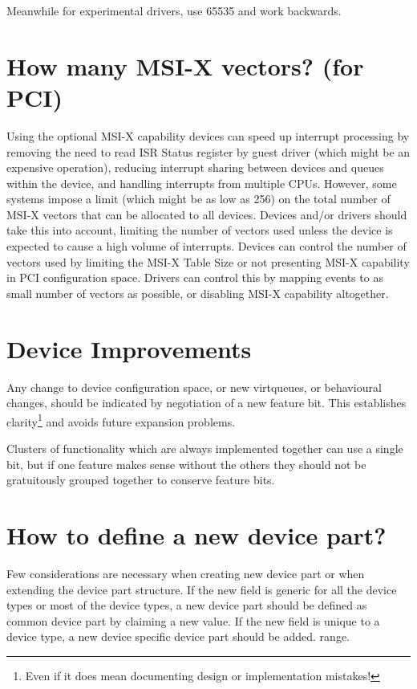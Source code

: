 Meanwhile for experimental drivers, use 65535 and work backwards.

\section{How many MSI-X vectors?  (for PCI)}\label{sec:Creating New Device Types / How many MSI-X vectors?  (for PCI)}

Using the optional MSI-X capability devices can speed up
interrupt processing by removing the need to read ISR Status
register by guest driver (which might be an expensive operation),
reducing interrupt sharing between devices and queues within the
device, and handling interrupts from multiple CPUs. However, some
systems impose a limit (which might be as low as 256) on the
total number of MSI-X vectors that can be allocated to all
devices. Devices and/or drivers should take this into
account, limiting the number of vectors used unless the device is
expected to cause a high volume of interrupts. Devices can
control the number of vectors used by limiting the MSI-X Table
Size or not presenting MSI-X capability in PCI configuration
space. Drivers can control this by mapping events to as small
number of vectors as possible, or disabling MSI-X capability
altogether.

\section{Device Improvements}\label{sec:Creating New Device Types / Device Improvements}

Any change to device configuration space, or new virtqueues, or
behavioural changes, should be indicated by negotiation of a new
feature bit. This establishes clarity\footnote{Even if it does mean documenting design or implementation
mistakes!
} and avoids future expansion problems.

Clusters of functionality which are always implemented together
can use a single bit, but if one feature makes sense without the
others they should not be gratuitously grouped together to
conserve feature bits.

\section{How to define a new device part?}\label{sec:Creating New Device Types or Extending the Device / How to define a new device part?}
Few considerations are necessary when creating new device part or
when extending the device part structure.
If the new field is generic for all the device types or most of the device types,
a new device part should be defined as common device part by claiming a new  value.
If the new field is unique to a device type, a new device specific device part should
be added.
range.

